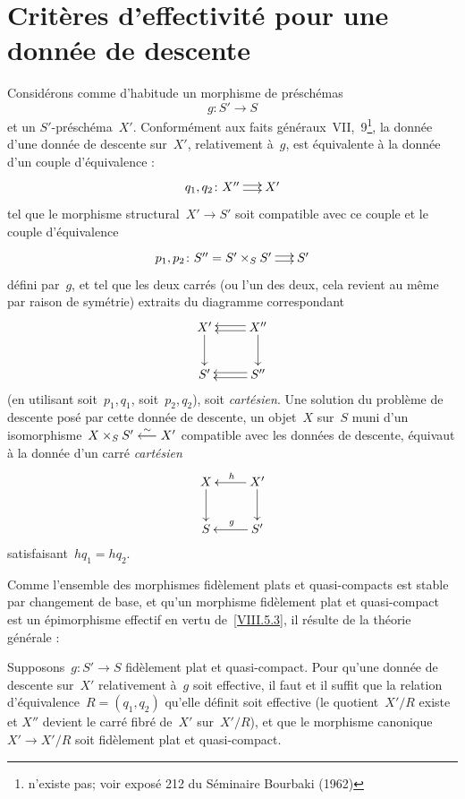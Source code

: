 \section{Crit\`eres d'effectivit\'e pour une donn\'ee de descente}
\label{VIII.7}

Consid\'erons comme d'habitude un morphisme de pr\'esch\'emas
$$
g\colon S'\to S
$$
et un $S'$-pr\'esch\'ema~$X'$. Conform\'ement aux faits
g\'en\'eraux~VII,~9\footnote{n'existe pas; voir expos\'e 212 du
S\'eminaire Bourbaki (1962)},
la donn\'ee d'une donn\'ee de descente sur~$X'$, relativement
\`a~$g$, est \'equivalente \`a la donn\'ee d'un couple
d'\'equivalence \cite{VIII.3}:
$$
\xymatrix@C=.5cm{{q_{1},q_{2}\colon X''}\ar@<2pt>[r]\ar@<-2pt>[r]&{X'}}
$$
tel que le morphisme structural~$X'\to S'$ soit compatible avec ce
couple et le couple d'\'equivalence
$$
\xymatrix@C=.5cm{{p_{1},p_{2}\colon
S''=S'\times_{S}S'}\ar@<2pt>[r]\ar@<-2pt>[r]&{S'}}
$$
d\'efini par~$g$, et tel que les deux carr\'es (ou l'un des deux,
cela revient au m\^eme par raison de sym\'etrie) extraits du
diagramme correspondant
$$
\xymatrix{{X'}\ar[d]&{X''}\ar@<2pt>[l]\ar@<-2pt>[l]\ar[d]\\{S'}&{S''}\ar@<2pt>[l]\ar@<-2pt>[l]}
$$
(en utilisant soit~$p_{1},q_{1}$, soit~$p_{2},q_{2}$), soit
\emph{cartésien}. Une solution du probl\`eme de descente
pos\'e par cette donn\'ee de descente, \ie un objet~$X$ sur~$S$
muni d'un isomorphisme~$X\times_{S}S'\overset{\sim}{\longleftarrow} X'$ compatible avec les
donn\'ees de descente, \'equivaut \`a la donn\'ee d'un
carr\'e \emph{cartésien}
$$
\xymatrix{{X}\ar[d]&{X'}\ar[l]_{h}\ar[d]\\{S}&{S'}\ar[l]_{g}}
$$
satisfaisant~$hq_{1}=hq_{2}$.

Comme
l'ensemble des morphismes fid\`element plats et quasi-compacts est
stable par changement de base, et qu'un morphisme fid\`element plat
et quasi-compact est un \'epimorphisme effectif en vertu
de~\ref{VIII.5.3}, il r\'esulte de la th\'eorie g\'en\'erale
\cite{VIII.D}:

\begin{proposition}
\label{VIII.7.1}
Supposons~$g\colon S'\to S$ fid\`element plat et quasi-compact. Pour
qu'une don\-n\'ee de descente sur~$X'$ relativement \`a~$g$ soit
effective, il faut et il suffit que la relation
d'\'equivalence~$R=(q_{1},q_{2})$ qu'elle d\'efinit soit effective
(\ie le quotient~$X'/R$ existe et $X''$ devient le carr\'e
fibr\'e de~$X'$ sur~$X'/R$), et que le morphisme canonique~$X'\to
X'/R$ soit fid\`element plat et quasi-compact.
\end{proposition}

